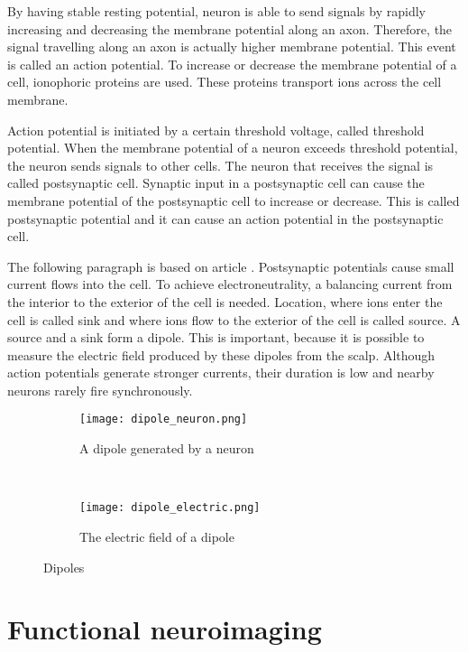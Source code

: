 By having stable resting potential, neuron is able to send signals by rapidly increasing and decreasing the membrane potential along an axon. Therefore, the signal travelling along an axon is actually higher membrane potential. This event is called an action potential. To increase or decrease the membrane potential of a cell, ionophoric proteins are used. These proteins transport ions across the cell membrane.

Action potential is initiated by a certain threshold voltage, called threshold potential. When the membrane potential of a neuron exceeds threshold potential, the neuron sends signals to other cells. The neuron that receives the signal is called postsynaptic cell. Synaptic input in a postsynaptic cell can cause the membrane potential of the postsynaptic cell to increase or decrease. This is called postsynaptic potential and it can cause an action potential in the postsynaptic cell.

The following paragraph is based on article \cite{electric_field}. Postsynaptic potentials cause small current flows into the cell. To achieve electroneutrality, a balancing current from the interior to the exterior of the cell is needed. Location, where ions enter the cell is called sink and where ions flow to the exterior of the cell is called source. A source and a sink form a dipole. This is important, because it is possible to measure the electric field produced by these dipoles from the scalp. Although action potentials generate stronger currents, their duration is low and nearby neurons rarely fire synchronously.

\begin{figure}[b!]
	\centering
	\begin{subfigure}{0.48\textwidth}
		\texttt{[image: dipole\_neuron.png]}
		\caption{A dipole generated by a neuron \cite[p.~669]{neuroscience}}
		\label{fig:dipole_neuron}
	\end{subfigure}
	~
	\begin{subfigure}{0.48\textwidth}
		\texttt{[image: dipole\_electric.png]}
		\caption{The electric field of a dipole} %
		\label{fig:dipole_electric}
	\end{subfigure}
	\caption{Dipoles}
	\label{fig:dipole}
\end{figure}

\section{Functional neuroimaging}
\label{sec:neuroimaging}

